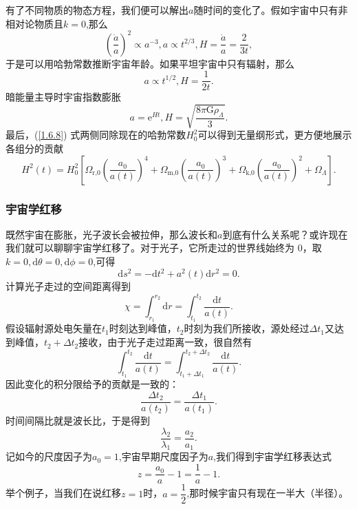 \documentclass[../天体物理基础.tex]{subfiles}
\begin{document}
有了不同物质的物态方程，我们便可以解出$a$随时间的变化了。假如宇宙中只有非相对论物质且$k=0$,那么
\begin{equation}
\left(\frac{\dot{a}}{a}\right)^{2}\propto{}a^{-3},a\propto{}t^{2/3},H=\frac{\dot{a}}{a}=\frac{2}{3t},
\end{equation}
于是可以用哈勃常数推断宇宙年龄。如果平坦宇宙中只有辐射，那么
\begin{equation}
a\propto{}t^{1/2},H=\frac{1}{2t}.
\end{equation}
暗能量主导时宇宙指数膨胀
\begin{equation}
a=\mathrm{e}^{Ht},H=\sqrt{\frac{8\pi\mathrm{G}\rho_{\Lambda}}{3}}.
\end{equation}
最后，(\ref{1.6.8}) 式两侧同除现在的哈勃常数$H_{0}^{2}$可以得到无量纲形式，更方便地展示各组分的贡献
\begin{equation}
H^{2}\left(t\right)=H_{0}^{2}\left[\Omega_{\text{r,0}}\left(\frac{a_{0}}{a\left(t\right)}\right)^{4}+\Omega_{\text{m,0}}\left(\frac{a_{0}}{a\left(t\right)}\right)^{3}+\Omega_{\text{k,0}}\left(\frac{a_{0}}{a\left(t\right)}\right)^{2}+\Omega_{\Lambda}\right].
\end{equation}

\subsubsection{宇宙学红移}
既然宇宙在膨胀，光子波长会被拉伸，那么波长和$a$到底有什么关系呢？或许现在我们就可以聊聊宇宙学红移了。对于光子，它所走过的世界线始终为 0，取$k=0,\mathrm{d}\theta=0,\mathrm{d}\phi=0$,可得
\begin{equation}
\mathrm{d}s^{2}=-\mathrm{d}t^{2}+a^{2}\left(t\right)\mathrm{d}r^{2}=0.
\end{equation}
计算光子走过的空间距离得到
\begin{equation}
\chi=\int_{r_{1}}^{r_{2}}\mathrm{d}r=\int_{t_{1}}^{t_{2}}\frac{\mathrm{d}t}{a\left(t\right)}.
\end{equation}
假设辐射源处电矢量在$t_{1}$时刻达到峰值，$t_{2}$时刻为我们所接收，源处经过$\Delta{}t_{1}$又达到峰值，$t_{2}+\Delta{}t_{2}$接收，由于光子走过距离一致，很自然有
\begin{equation}
\int_{t_{1}}^{t_{2}}\frac{\mathrm{d}t}{a\left(t\right)}=\int_{t_{1}+\Delta{}t_{1}}^{t_{2}+\Delta{}t_{2}}\frac{\mathrm{d}t}{a\left(t\right)}.
\end{equation}
因此变化的积分限给予的贡献是一致的：
\begin{equation}
\frac{\Delta{}t_{2}}{a\left(t_{2}\right)}=\frac{\Delta{}t_{1}}{a\left(t_{1}\right)}.
\end{equation}
时间间隔比就是波长比，于是得到
\begin{equation}
\frac{\lambda_{2}}{\lambda_{1}}=\frac{a_{2}}{a_{1}}.
\end{equation}
记如今的尺度因子为$a_{0}=1$,宇宙早期尺度因子为$a$,我们得到宇宙学红移表达式
\begin{equation}
z=\frac{a_{0}}{a}-1=\frac{1}{a}-1.
\end{equation}
举个例子，当我们在说红移$z=1$时，$a=\dfrac12$,那时候宇宙只有现在一半大（半径）。
\end{document}
